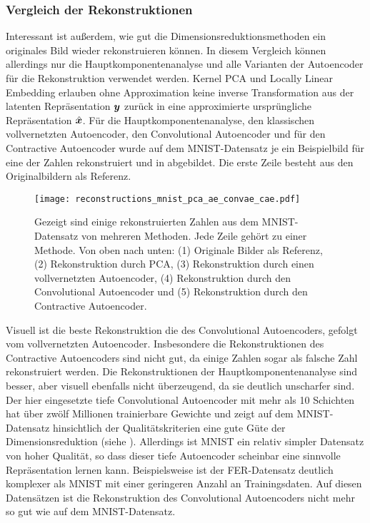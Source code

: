 \subsubsection{Vergleich der Rekonstruktionen}

Interessant ist außerdem, wie gut die Dimensionsreduktionsmethoden ein originales Bild wieder
rekonstruieren können. In diesem Vergleich können allerdings nur die Hauptkomponentenanalyse und
alle Varianten der Autoencoder für die Rekonstruktion verwendet werden. Kernel PCA und Locally
Linear Embedding erlauben ohne Approximation keine inverse Transformation aus der latenten
Repräsentation $\bm{y}$ zurück in eine approximierte ursprüngliche Repräsentation
$\hat{\bm{x}}$. Für die Hauptkomponentenanalyse, den klassischen vollvernetzten
Autoencoder, den Convolutional Autoencoder und für den Contractive Autoencoder wurde auf dem
MNIST-Datensatz je ein Beispielbild für eine der Zahlen rekonstruiert und in
 abgebildet. Die erste Zeile besteht aus den Originalbildern als
Referenz.
\begin{figure}[ht]
	\centering
	\texttt{[image: reconstructions\_mnist\_pca\_ae\_convae\_cae.pdf]}
	\caption[Rekonstruierte MNIST-Zahlen]{Gezeigt sind einige rekonstruierten Zahlen aus dem MNIST-Datensatz von mehreren Methoden. Jede Zeile gehört zu einer Methode. Von oben nach unten: (1) Originale Bilder als Referenz, (2) Rekonstruktion durch PCA, (3) Rekonstruktion durch einen vollvernetzten Autoencoder, (4) Rekonstruktion durch den Convolutional Autoencoder und (5) Rekonstruktion durch den Contractive Autoencoder.}
	\label{fig:MNIST-reconstructions}
\end{figure}
Visuell ist die beste Rekonstruktion die des Convolutional Autoencoders, gefolgt vom vollvernetzten Autoencoder. Insbesondere die Rekonstruktionen des Contractive Autoencoders sind nicht gut, da einige Zahlen sogar als falsche Zahl rekonstruiert werden. Die Rekonstruktionen der Hauptkomponentenanalyse sind besser, aber visuell ebenfalls nicht überzeugend, da sie deutlich unscharfer sind. Der hier eingesetzte tiefe Convolutional Autoencoder mit mehr als 10 Schichten hat über zwölf Millionen trainierbare Gewichte und zeigt auf dem MNIST-Datensatz hinsichtlich der Qualitätskriterien eine gute Güte der Dimensionsreduktion (siehe ). Allerdings ist MNIST ein relativ simpler Datensatz von hoher Qualität, so dass dieser tiefe Autoencoder scheinbar eine sinnvolle Repräsentation lernen kann. Beispielsweise ist der FER-Datensatz deutlich komplexer als MNIST mit einer geringeren Anzahl an Trainingsdaten. Auf diesen Datensätzen ist die Rekonstruktion des Convolutional Autoencoders nicht mehr so gut wie auf dem MNIST-Datensatz.

